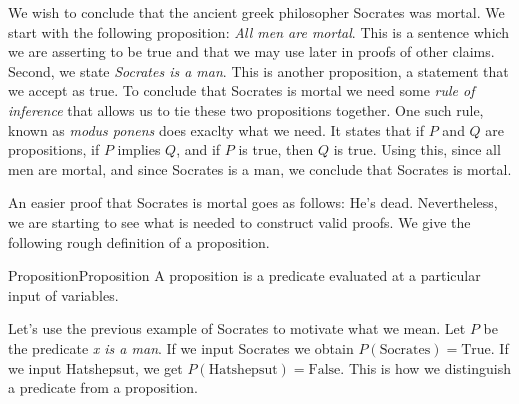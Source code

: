         \begin{example}
            We wish to conclude that the ancient greek philosopher
            Socrates was
            mortal. We start with the following proposition:
            \textit{All men are mortal}. This is a sentence which we are
            asserting to be true and that we may use later in proofs of other
            claims. Second, we state \textit{Socrates is a man}. This is another
            proposition, a statement that we accept as true. To conclude that
            Socrates is mortal we need some \textit{rule of inference} that
            allows us to tie these two propositions together. One such rule,
            known as \textit{modus ponens} does exaclty what
            we need. It states that if $P$ and $Q$ are propositions, if $P$
            implies $Q$, and if $P$ is true, then $Q$ is true. Using this, since
            all men are mortal, and since Socrates is a man, we conclude that
            Socrates is mortal.
        \end{example}
        An easier proof that Socrates is mortal goes as follows: He's dead.
        Nevertheless, we are starting to see what is needed to construct valid
        proofs. We give the following rough definition of a proposition.
        \begin{fdefinition}{Proposition}{Proposition}
            A proposition is a predicate evaluated at a particular input of
            variables.
        \end{fdefinition}
        \begin{example}
            Let's use the previous example of Socrates to motivate what we mean.
            Let $P$ be the predicate \textit{x is a man}. If we input Socrates
            we obtain $P(\text{Socrates})=\text{True}$. If we input Hatshepsut,
            we get $P(\text{Hatshepsut})=\text{False}$. This is how we
            distinguish a predicate from a proposition.
        \end{example}
